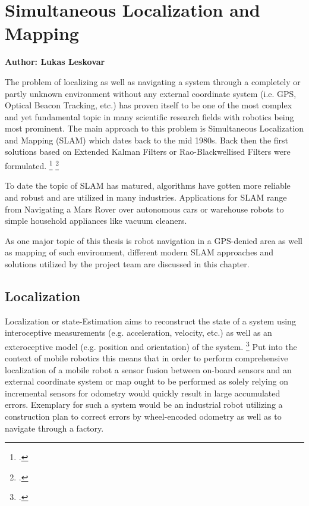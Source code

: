 \chapter{Simultaneous Localization and Mapping}
\label{chapter:slam}

\textbf{Author: Lukas Leskovar} 

The problem of localizing as well as navigating a system through a completely or partly unknown environment without any external coordinate system (i.e. GPS, Optical Beacon Tracking, etc.) has proven itself to be one of the most complex and yet fundamental topic in many scientific research fields with robotics being most prominent. The main approach to this problem is Simultaneous Localization and Mapping (SLAM) which dates back to the mid 1980s. Back then the first solutions based on Extended Kalman Filters or Rao-Blackwellised Filters were formulated. \footcite{durrantSlam2006}  \footcite{cadenaSlamFuture2016}

To date the topic of SLAM has matured, algorithms have gotten more reliable and robust and are utilized in many industries. Applications for SLAM range from Navigating a Mars Rover over autonomous cars or warehouse robots to simple household appliances like vacuum cleaners. 

As one major topic of this thesis is robot navigation in a GPS-denied area as well as mapping of such environment, different modern SLAM approaches and solutions utilized by the project team are discussed in this chapter.

\section{Localization}
Localization or state-Estimation aims to reconstruct the state of a system using interoceptive measurements (e.g. acceleration, velocity, etc.) as well as an exteroceptive model (e.g. position and orientation) of the system. \footcite{barfootStateEstimation2017}
Put into the context of mobile robotics this means that in order to perform comprehensive localization of a mobile robot a sensor fusion between on-board sensors and an external coordinate system or map ought to be performed as solely relying on incremental sensors for odometry would quickly result in large accumulated errors.
Exemplary for such a system would be an industrial robot utilizing a construction plan to correct errors by wheel-encoded odometry as well as to navigate through a factory. 

